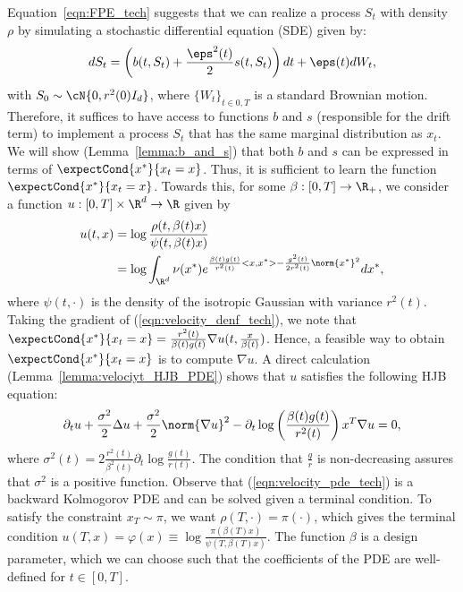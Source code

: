 Equation~\ref{eqn:FPE_tech} suggests that we can realize a process $S_t$ with density $\rho$ by simulating a stochastic differential equation (SDE) given by:
\begin{equation}\label{eqn:SDEforSampling_tech}
   dS_t = \left(b(t,S_t)+\frac{\eps^2(t)}{2}s(t,S_t)\right)dt+\eps(t)dW_t,%
\end{equation}
with $S_0\sim\cN{0,r^2(0)I_d}$, where $\{W_t\}_{t\in{0,T}}$ is a standard Brownian motion.
Therefore, it suffices to have access to functions $b$ and $s$ (responsible for the drift term) to implement a process $S_t$ that has the same marginal distribution as $x_t$. We will show (Lemma~\ref{lemma:b_and_s}) that both $b$ and $s$ can be expressed in terms of $\expectCond{x^*}{x_t=x}$. Thus, it is sufficient to learn the function $\expectCond{x^*}{x_t=x}$. Towards this, for some $\beta:[0,T]\rightarrow\R_+$, we consider a function $u:[0,T]\times\R^d\rightarrow\R$ given by
\begin{align}\label{eqn:velocity_denf_tech}
    u(t,x) &= \log\frac{\rho(t,\beta(t)x)}{\psi(t,\beta(t)x)}\\ &= \log\int_{\R^d}\nu(x^*)e^{\frac{\beta(t)g(t)}{r^2(t)}<x,x^*>-\frac{g^2(t)}{2r^2(t)}\norm{x^*}^2}dx^*,\nonumber
\end{align}
where $\psi(t,\cdot)$ is the density of the isotropic Gaussian with variance $r^2(t)$. Taking the gradient of (\ref{eqn:velocity_denf_tech}), we note that $\expectCond{x^*}{x_t=x} = \frac{r^2(t)}{\beta(t)g(t)}\nabla u(t,\frac{x}{\beta(t)})$. Hence, a feasible way to obtain $\expectCond{x^*}{x_t=x}$ is to compute $\nabla u$. A direct calculation (Lemma~\ref{lemma:velociyt_HJB_PDE}) shows that $u$ satisfies the following HJB equation:
\begin{equation}\label{eqn:velocity_pde_tech}
    \partial_t u + \frac{\sigma^2}{2}\Delta u + \frac{\sigma^2}{2}\norm{\nabla u}^2-\partial_t\log\left(\frac{\beta(t)g(t)}{r^2(t)}\right)x^T\nabla u = 0,
\end{equation}
where $\sigma^2(t) = 2\frac{r^2(t)}{\beta^2(t)}\partial_t\log\frac{g(t)}{r(t)}$. The condition that $\frac{g}{r}$ is non-decreasing assures that $\sigma^2$ is a positive function. 
Observe that (\ref{eqn:velocity_pde_tech}) is a backward Kolmogorov PDE and can be solved given a terminal condition. To satisfy the constraint $x_T\sim\pi$, we want $\rho(T,\cdot)=\pi(\cdot)$, which gives the terminal condition $u(T, x)= \varphi(x) \equiv \log\frac{\pi(\beta(T)x)}{\psi(T,\beta(T)x)}$. The function $\beta$ is a design parameter, which we can choose such that the coefficients of the PDE are well-defined for $t\in[0,T]$. 

